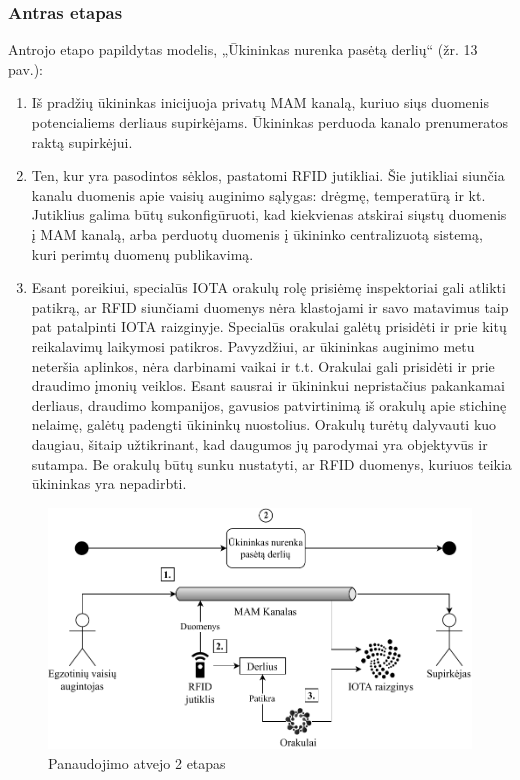\subsubsection{Antras etapas}

Antrojo etapo papildytas modelis, „Ūkininkas nurenka pasėtą derlių“ (žr. 13 pav.):
\begin{enumerate}
    \item Iš pradžių ūkininkas inicijuoja privatų MAM kanalą, kuriuo siųs duomenis potencialiems derliaus supirkėjams. Ūkininkas perduoda kanalo prenumeratos raktą supirkėjui.
    \item Ten, kur yra pasodintos sėklos, pastatomi RFID jutikliai. Šie jutikliai siunčia kanalu duomenis apie vaisių auginimo sąlygas: drėgmę, temperatūrą ir kt. Jutiklius galima būtų sukonfigūruoti, kad kiekvienas atskirai siųstų duomenis į MAM kanalą, arba perduotų duomenis į ūkininko centralizuotą sistemą, kuri perimtų duomenų publikavimą.
    \item Esant poreikiui, specialūs IOTA orakulų rolę prisiėmę inspektoriai gali atlikti patikrą, ar RFID siunčiami duomenys nėra klastojami ir savo matavimus taip pat patalpinti IOTA raizginyje. Specialūs orakulai galėtų prisidėti ir prie kitų reikalavimų laikymosi patikros. Pavyzdžiui, ar ūkininkas auginimo metu neteršia aplinkos, nėra darbinami vaikai ir t.t. Orakulai gali prisidėti ir prie draudimo įmonių veiklos. Esant sausrai ir ūkininkui nepristačius pakankamai derliaus, draudimo kompanijos, gavusios patvirtinimą iš orakulų apie stichinę nelaimę, galėtų padengti ūkininkų nuostolius. Orakulų turėtų dalyvauti kuo daugiau, šitaip užtikrinant, kad daugumos jų parodymai yra objektyvūs ir sutampa. Be orakulų būtų sunku nustatyti, ar RFID duomenys, kuriuos teikia ūkininkas yra nepadirbti.
\end{enumerate}

\begin{figure}[H]
    \centering
    \includegraphics[scale=0.7]{images/iota-usecase-2}
    \caption{Panaudojimo atvejo 2 etapas}
\end{figure}



